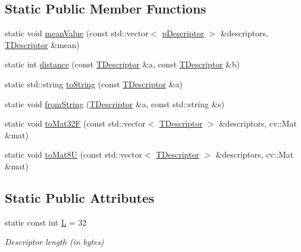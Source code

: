 \subsection*{Static Public Member Functions}
\begin{DoxyCompactItemize}
\item 
static void \mbox{\hyperlink{class_d_bo_w2_1_1_f_o_r_b_a9d78adf3c5c6fe8f2e8668e247acf5cc}{mean\+Value}} (const std\+::vector$<$ \mbox{\hyperlink{class_d_bo_w2_1_1_f_class_a9c94e662003f61413fd542d67b45c3a9}{p\+Descriptor}} $>$ \&descriptors, \mbox{\hyperlink{class_d_bo_w2_1_1_f_o_r_b_aef9b966d0293836fab9f55f1799ce0ed}{T\+Descriptor}} \&mean)
\item 
static int \mbox{\hyperlink{class_d_bo_w2_1_1_f_o_r_b_ac166ab6808abc7c385dbaabfacfed38c}{distance}} (const \mbox{\hyperlink{class_d_bo_w2_1_1_f_o_r_b_aef9b966d0293836fab9f55f1799ce0ed}{T\+Descriptor}} \&a, const \mbox{\hyperlink{class_d_bo_w2_1_1_f_o_r_b_aef9b966d0293836fab9f55f1799ce0ed}{T\+Descriptor}} \&b)
\item 
static std\+::string \mbox{\hyperlink{class_d_bo_w2_1_1_f_o_r_b_a3c0ce0fd04ecd52b25b97d253fb922ea}{to\+String}} (const \mbox{\hyperlink{class_d_bo_w2_1_1_f_o_r_b_aef9b966d0293836fab9f55f1799ce0ed}{T\+Descriptor}} \&a)
\item 
static void \mbox{\hyperlink{class_d_bo_w2_1_1_f_o_r_b_a4023e7775d0691b44f6708f865b6b8d7}{from\+String}} (\mbox{\hyperlink{class_d_bo_w2_1_1_f_o_r_b_aef9b966d0293836fab9f55f1799ce0ed}{T\+Descriptor}} \&a, const std\+::string \&s)
\item 
static void \mbox{\hyperlink{class_d_bo_w2_1_1_f_o_r_b_a67b90eaed01dd54e380237c78886635f}{to\+Mat32F}} (const std\+::vector$<$ \mbox{\hyperlink{class_d_bo_w2_1_1_f_o_r_b_aef9b966d0293836fab9f55f1799ce0ed}{T\+Descriptor}} $>$ \&descriptors, cv\+::\+Mat \&mat)
\item 
static void \mbox{\hyperlink{class_d_bo_w2_1_1_f_o_r_b_af0a9e2ea44336f2975a7f3324777330c}{to\+Mat8U}} (const std\+::vector$<$ \mbox{\hyperlink{class_d_bo_w2_1_1_f_o_r_b_aef9b966d0293836fab9f55f1799ce0ed}{T\+Descriptor}} $>$ \&descriptors, cv\+::\+Mat \&mat)
\end{DoxyCompactItemize}
\subsection*{Static Public Attributes}
\begin{DoxyCompactItemize}
\item 
static const int \mbox{\hyperlink{class_d_bo_w2_1_1_f_o_r_b_ad6ed07af4e042effc3c0b169aa5bdd1a}{L}} = 32
\begin{DoxyCompactList}\small\item\em Descriptor length (in bytes) \end{DoxyCompactList}\end{DoxyCompactItemize}


